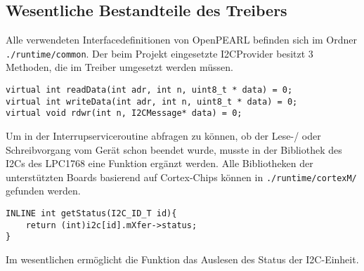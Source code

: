 \documentclass[12pt,a4paper]{article}
\begin{document}
\subsection{Wesentliche Bestandteile des Treibers}
Alle verwendeten Interfacedefinitionen von OpenPEARL befinden sich im Ordner \verb+./runtime/common+.
Der beim Projekt eingesetzte I2CProvider besitzt 3 Methoden, die im Treiber umgesetzt werden müssen.
\begin{verbatim}
virtual int readData(int adr, int n, uint8_t * data) = 0;
virtual int writeData(int adr, int n, uint8_t * data) = 0;
virtual void rdwr(int n, I2CMessage* data) = 0;
\end{verbatim}
Um in der Interrupserviceroutine abfragen zu können, ob der Lese-/ oder Schreibvorgang vom Gerät schon beendet wurde, musste in der Bibliothek des I2Cs des LPC1768 eine Funktion ergänzt werden. Alle Bibliotheken der unterstützten Boards basierend auf Cortex-Chips können in \verb+./runtime/cortexM/+ gefunden werden.
\begin{verbatim}
INLINE int getStatus(I2C_ID_T id){
	return (int)i2c[id].mXfer->status;
}
\end{verbatim}
Im wesentlichen ermöglicht die Funktion das Auslesen des Status der I2C-Einheit. 
\end{document}

